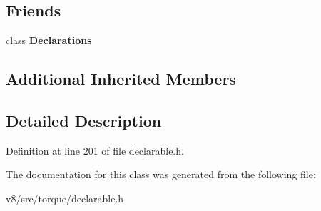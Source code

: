 \subsection*{Friends}
\begin{DoxyCompactItemize}
\item 
\mbox{\label{classv8_1_1internal_1_1torque_1_1NamespaceConstant_a23135931a5f054329315374b774718cf}} 
class {\bfseries Declarations}
\end{DoxyCompactItemize}
\subsection*{Additional Inherited Members}


\subsection{Detailed Description}


Definition at line 201 of file declarable.\+h.



The documentation for this class was generated from the following file\+:\begin{DoxyCompactItemize}
\item 
v8/src/torque/declarable.\+h\end{DoxyCompactItemize}
